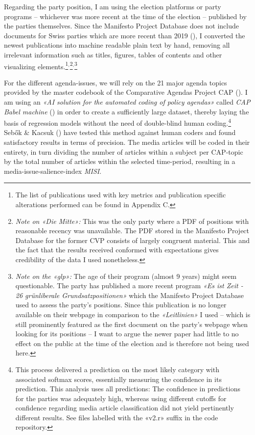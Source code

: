 \documentclass[11pt,a4paper]{article}
\begin{document}
Regarding the party position, I am using the election platforms or party programs – whichever was more recent at the time of the election – published by the parties themselves. Since the Manifesto Project Database does not include documents for Swiss parties which are more recent than 2019 (\cite{lehmann_manifesto_2023}), I converted the newest publications into machine readable plain text by hand, removing all irrelevant information such as titles, figures, tables of contents and other visualizing elements.\footnote{The list of publications used with key metrics and publication specific alterations performed can be found in Appendix C.}$^{, }$\footnote{\textit{Note on «Die Mitte»:} This was the only party where a PDF of positions with reasonable recency was unavailable. The PDF stored in the Manifesto Project Database for the former CVP consists of largely congruent material. This and the fact that the results received conformed with expectations gives credibility of the data I used nonetheless.}$^{, }$\footnote{\textit{Note on the «glp»:} The age of their program (almost 9 years) might seem questionable. The party has published a more recent program \textit{«Es ist Zeit - 26 grünliberale Grundsatzpositionen»} which the Manifesto Project Database used to assess the party’s positions. Since this publication is no longer available on their webpage in comparison to the \textit{«Leitlinien»} I used – which is still prominently featured as the first document on the party’s webpage when looking for its positions – I want to argue the newer paper had little to no effect on the public at the time of the election and is therefore not being used here.}

For the different agenda-issues, we will rely on the 21 major agenda topics provided by the master codebook of the Comparative Agendas Project CAP (\cite{bevan_gone_2019}). I am using an \textit{«AI solution for the automated coding of policy agendas»} called \textit{CAP Babel machine }(\cite{poltextlab_cap_2023}) in order to create a sufficiently large dataset, thereby laying the basis of regression models without the need of double-blind human coding.\footnote{This process delivered a prediction on the most likely category with associated softmax scores, essentially measuring the confidence in its prediction. This analysis uses all predictions: The confidence in predictions for the parties was adequately high, whereas using different cutoffs for confidence regarding media article classification did not yield pertinently different results. See files labelled with the «v2.r» suffix in the code repository.} Sebők \& Kacsuk (\citeyear{sebok_multiclass_2021}) have tested this method against human coders and found satisfactory results in terms of precision. The media articles will be coded in their entirety, in turn dividing the number of articles within a subject per CAP-topic by the total number of articles within the selected time-period, resulting in a media-issue-salience-index \textit{MISI}.
\end{document}
